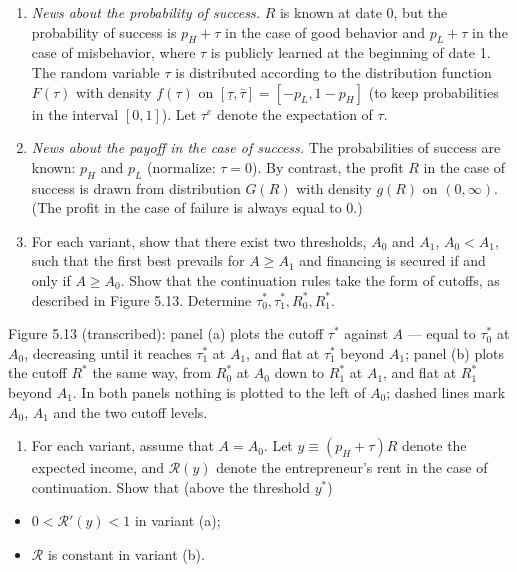 \documentclass[11pt,a4paper]{article}
\providecommand{\tightlist}{\setlength{\itemsep}{0pt}\setlength{\parskip}{0pt}}
\begin{document}
\begin{enumerate}
\def\labelenumi{(\alph{enumi})}
\item
  \emph{News about the probability of success.} \(R\) is known at date 0, but the probability of
  success is \(p_H + \tau\) in the case of good behavior and \(p_L + \tau\) in the case of
  misbehavior, where \(\tau\) is publicly learned at the beginning of date 1. The random variable
  \(\tau\) is distributed according to the distribution function \(F(\tau)\) with density
  \(f(\tau)\) on \([\underline{\tau}, \bar\tau] = [-p_L, 1 - p_H]\) (to keep probabilities in the
  interval \([0, 1]\)). Let \(\tau^e\) denote the expectation of \(\tau\).
\item
  \emph{News about the payoff in the case of success.} The probabilities of success are known:
  \(p_H\) and \(p_L\) (normalize: \(\tau = 0\)). By contrast, the profit \(R\) in the case of
  success is drawn from distribution \(G(R)\) with density \(g(R)\) on \((0, \infty)\). (The profit
  in the case of failure is always equal to 0.)
\item
  For each variant, show that there exist two thresholds, \(A_0\) and \(A_1\), \(A_0 < A_1\), such
  that the first best prevails for \(A \geqslant A_1\) and financing is secured if and only if
  \(A \geqslant A_0\). Show that the continuation rules take the form of cutoffs, as described in
  Figure 5.13. Determine \(\tau_0^*, \tau_1^*, R_0^*, R_1^*\).
\end{enumerate}

Figure 5.13 (transcribed): panel (a) plots the cutoff \(\tau^*\) against \(A\) --- equal to
\(\tau_0^*\) at \(A_0\), decreasing until it reaches \(\tau_1^*\) at \(A_1\), and flat at
\(\tau_1^*\) beyond \(A_1\); panel (b) plots the cutoff \(R^*\) the same way, from \(R_0^*\) at
\(A_0\) down to \(R_1^*\) at \(A_1\), and flat at \(R_1^*\) beyond \(A_1\). In both panels nothing
is plotted to the left of \(A_0\); dashed lines mark \(A_0\), \(A_1\) and the two cutoff levels.

\begin{enumerate}
\def\labelenumi{(\roman{enumi})}
\setcounter{enumi}{1}
\tightlist
\item
  For each variant, assume that \(A = A_0\). Let \(y \equiv (p_H + \tau)R\) denote the expected
  income, and \(\mathcal{R}(y)\) denote the entrepreneur's rent in the case of continuation. Show
  that (above the threshold \(y^*\))
\end{enumerate}

\begin{itemize}
\tightlist
\item
  \(0 < \mathcal{R}'(y) < 1\) in variant (a);
\item
  \(\mathcal{R}\) is constant in variant (b).
\end{itemize}
\end{document}
